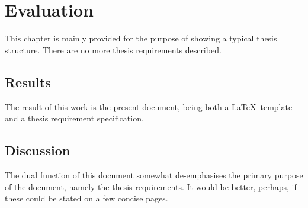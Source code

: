 \chapter{Evaluation}\label{ch:eval}

This chapter is mainly provided for the purpose of showing a typical thesis
structure.  There are no more thesis requirements described.

\section{Results}

The result of this work is the present document, being both a \LaTeX\
template and a thesis requirement specification.

\section{Discussion}

The dual function of this document somewhat de-emphasises the primary
purpose of the document, namely the thesis requirements.  It would be
better, perhaps, if these could be stated on a few concise pages.
